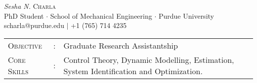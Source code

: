 \documentclass[letterpaper,10pt]{article}
\begin{document}
\begin{center}
\thispagestyle{empty}
\huge{\textit{Sesha N.} \textsc{Charla}}\\
\small PhD Student $\cdot$ School of Mechanical Engineering $\cdot$ Purdue University\\
\small scharla@purdue.edu $\mid$ +1 (765) 714 4235   \\
\end{center}


\begin{tabular}{l c l}
    {\large{\textsc{Objective}}}&:& Graduate Research Assistantship\\
{\large{\textsc{Core Skills}}}&:& Control Theory, Dynamic Modelling, Estimation,
System Identification and Optimization.\\
\end{tabular}

\end{document}
